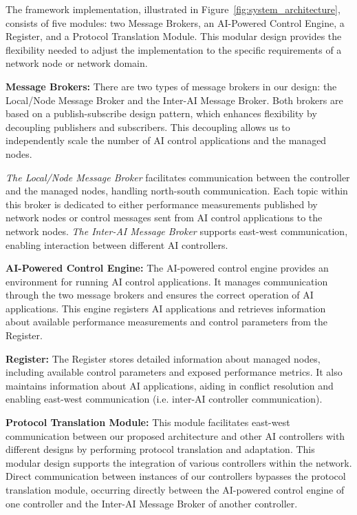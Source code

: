 The framework implementation, illustrated in Figure~\ref{fig:system_architecture}, consists of five modules: two Message Brokers, an AI-Powered Control Engine, a Register, and a Protocol Translation Module. This modular design provides the flexibility needed to adjust the implementation to the specific requirements of a network node or network domain.

\textbf{Message Brokers:}
There are two types of message brokers in our design: the Local/Node Message Broker and the Inter-AI Message Broker. Both brokers are based on a publish-subscribe design pattern, which enhances flexibility by decoupling publishers and subscribers. This decoupling allows us to independently scale the number of AI control applications and the managed nodes.

\textit{The Local/Node Message Broker} facilitates communication between the controller and the managed nodes, handling north-south communication. Each topic within this broker is dedicated to either performance measurements published by network nodes or control messages sent from AI control applications to the network nodes. \textit{The Inter-AI Message Broker} supports east-west communication, enabling interaction between different AI controllers.

\textbf{AI-Powered Control Engine:}
The AI-powered control engine provides an environment for running AI control applications. It manages communication through the two message brokers and ensures the correct operation of AI applications. This engine registers AI applications and retrieves information about available performance measurements and control parameters from the Register.

\textbf{Register:}
The Register stores detailed information about managed nodes, including available control parameters and exposed performance metrics. It also maintains information about AI applications, aiding in conflict resolution and enabling east-west communication (i.e. inter-AI controller communication).

\textbf{Protocol Translation Module:}
This module facilitates east-west communication between our proposed architecture and other AI controllers with different designs by performing protocol translation and adaptation. This modular design supports the integration of various controllers within the network. Direct communication between instances of our controllers bypasses the protocol translation module, occurring directly between the AI-powered control engine of one controller and the Inter-AI Message Broker of another controller.

